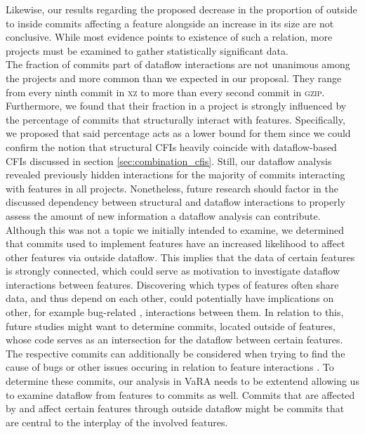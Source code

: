 Likewise, our results regarding the proposed decrease in the proportion of outside to inside commits affecting a feature alongside an increase in its size are not conclusive.
While most evidence points to existence of such a relation, more projects must be examined to gather statistically significant data. \\
The fraction of commits part of dataflow interactions are not unanimous among the projects and more common than we expected in our proposal.
They range from every ninth commit in \textsc{xz} to more than every second commit in \textsc{gzip}.
Furthermore, we found that their fraction in a project is strongly influenced by the percentage of commits that structurally interact with features.
Specifically, we proposed that said percentage acts as a lower bound for them since we could confirm the notion that structural CFIs heavily coincide with dataflow-based CFIs discussed in section \ref{sec:combination_cfis}.
Still, our dataflow analysis revealed previously hidden interactions for the majority of commits interacting with features in all projects.
Nonetheless, future research should factor in the discussed dependency between structural and dataflow interactions to properly assess the amount of new information a dataflow analysis can contribute. \\
Although this was not a topic we initially intended to examine, we determined that commits used to implement features have an increased likelihood to affect other features via outside dataflow.
This implies that the data of certain features is strongly connected, which could serve as motivation to investigate dataflow interactions between features.
Discovering which types of features often share data, and thus depend on each other, could potentially have implications on other, for example bug-related \cite{nie2011survey}, interactions between them.
In relation to this, future studies might want to determine commits, located outside of features, whose code serves as an intersection for the dataflow between certain features.
The respective commits can additionally be considered when trying to find the cause of bugs or other issues occuring in relation to feature interactions \cite{apel2014feature}.
To determine these commits, our analysis in VaRA needs to be extentend allowing us to examine dataflow from features to commits as well.
Commits that are affected by and affect certain features through outside dataflow might be commits that are central to the interplay of the involved features. \\
